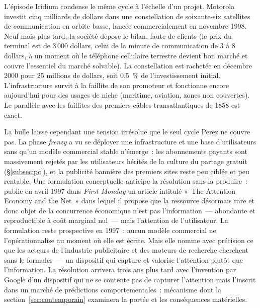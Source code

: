 L'épisode Iridium condense le même cycle à l'échelle d'un projet. Motorola investit cinq milliards de dollars dans une constellation de soixante-six satellites de communication en orbite basse, lancée commercialement en novembre 1998. Neuf mois plus tard, la société dépose le bilan, faute de clients (le prix du terminal est de 3\,000 dollars, celui de la minute de communication de 3 à 8 dollars, à un moment où le téléphone cellulaire terrestre devient bon marché et couvre l'essentiel du marché solvable). La constellation est rachetée en décembre 2000 pour 25 millions de dollars, soit 0,5~\% de l'investissement initial. L'infrastructure survit à la faillite de son promoteur et fonctionne encore aujourd'hui pour des usages de niche (maritime, aviation, zones non couvertes). Le parallèle avec les faillites des premiers câbles transatlantiques de 1858 est exact.

%
La bulle laisse cependant une tension irrésolue que le seul cycle Perez ne couvre pas. La phase \emph{frenzy} a vu se déployer une infrastructure et une base d'utilisateurs sans qu'un modèle commercial stable n'émerge~: les abonnements payants sont massivement rejetés par les utilisateurs hérités de la culture du partage gratuit (§\ref{subsec:pc}), et la publicité bannière des premiers sites reste peu ciblée et peu rentable. Une formulation conceptuelle anticipe la résolution sans la produire~: \textcite{goldhaber_attention_1997} publie en avril 1997 dans \emph{First Monday} un article intitulé «~The Attention Economy and the Net~» dans lequel il propose que la ressource désormais rare et donc objet de la concurrence économique n'est pas l'information~--- abondante et reproductible à coût marginal nul~--- mais l'attention de l'utilisateur. La formulation reste prospective en 1997~: aucun modèle commercial ne l'opérationnalise au moment où elle est écrite. Mais elle nomme avec précision ce que les acteurs de l'industrie publicitaire et des moteurs de recherche cherchent sans le formuler~--- un dispositif qui capture et valorise l'attention plutôt que l'information. La résolution arrivera trois ans plus tard avec l'invention par Google d'un dispositif qui ne se contente pas de capturer l'attention mais l'inscrit dans un marché de prédictions comportementales~: mécanisme dont la section~\ref{sec:contemporain} examinera la portée et les conséquences matérielles.

 
